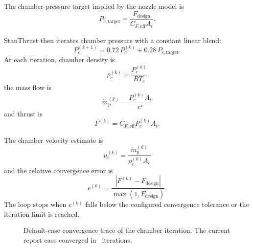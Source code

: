 \documentclass[11pt]{article}
\newcommand{\mdotp}{\dot{m}_{p}}
\begin{document}
The chamber-pressure target implied by the nozzle model is
\begin{equation}
P_{c,\text{target}}=\frac{F_{\text{design}}}{C_{F,\text{eff}}A_t}.
\label{eq:pc-target}
\end{equation}

StanThrust then iterates chamber pressure with a constant linear blend:
\begin{equation}
P_c^{(k+1)}=0.72\,P_c^{(k)}+0.28\,P_{c,\text{target}}.
\label{eq:pc-iter}
\end{equation}
At each iteration, chamber density is
\begin{equation}
\rho_c^{(k)}=\frac{P_c^{(k)}}{RT_c}
\label{eq:rho-chamber}
\end{equation}
the mass flow is
\begin{equation}
\mdotp^{(k)}=\frac{P_c^{(k)}A_t}{c^\star}
\label{eq:mdot-iter}
\end{equation}
and thrust is
\begin{equation}
F^{(k)}=C_{F,\text{eff}}P_c^{(k)}A_t.
\label{eq:thrust-iter}
\end{equation}

The chamber velocity estimate is
\begin{equation}
u_c^{(k)}=\frac{\mdotp^{(k)}}{\rho_c^{(k)}A_c}
\label{eq:chamber-velocity}
\end{equation}
and the relative convergence error is
\begin{equation}
e^{(k)}=\frac{|F^{(k)}-F_{\text{design}}|}{\max(1,F_{\text{design}})}.
\label{eq:iter-error}
\end{equation}
The loop stops when $e^{(k)}$ falls below the configured convergence tolerance or the iteration limit is reached.

\begin{figure}[H]
\centering
{}
\caption{Default-case convergence trace of the chamber iteration. The current report case converged in \SampleIterations\ iterations.}
\end{figure}
\end{document}
